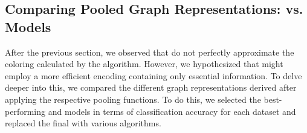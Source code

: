 \FloatBarrier
\subsection{Comparing Pooled Graph Representations: \gnn vs. \wlnn Models}
After the previous section, we observed that \gnns do not perfectly approximate the coloring calculated by the \wl algorithm. However, we hypothesized that \gnns might employ a more efficient encoding containing only essential information. To delve deeper into this, we compared the different graph representations derived after applying the respective pooling functions. To do this, we selected the best-performing \gnn and \wlnn models in terms of classification accuracy for each dataset and replaced the final \mlp with various algorithms.

\begin{table}[!htb]
	\caption{Overview of the classification accuracies achieved by the best model configuration for each dataset in percent and standard deviation. Additionally, the performance of each configuration was furhter evaluated by substituting the final \mlp with either a \textsf{SVM} utilizing a linear kernel (\textsf{SVM Linear}) or the Radial Basis Function (\textsf{SVM RBF}), as well as the \textsf{$k$-NN} classifier with different values for $k$.}
	\label{tab:pool_analysis}  
\end{table}
